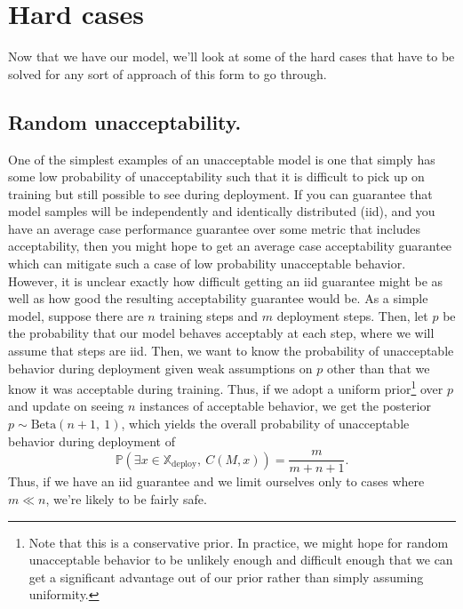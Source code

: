 \documentclass{amsart}
\begin{document}
\section{Hard cases}

Now that we have our model, we'll look at some of the hard cases that have to be solved for any sort of approach of this form to go through.

\subsection{Random unacceptability.} One of the simplest examples of an unacceptable model is one that simply has some low probability of unacceptability such that it is difficult to pick up on training but still possible to see during deployment. If you can guarantee that model samples will be independently and identically distributed (iid), and you have an average case performance guarantee over some metric that includes acceptability, then you might hope to get an average case acceptability guarantee which can mitigate such a case of low probability unacceptable behavior. However, it is unclear exactly how difficult getting an iid guarantee might be as well as how good the resulting acceptability guarantee would be. As a simple model, suppose there are $n$ training steps and $m$ deployment steps. Then, let $p$ be the probability that our model behaves acceptably at each step, where we will assume that steps are iid. Then, we want to know the probability of unacceptable behavior during deployment given weak assumptions on $p$ other than that we know it was acceptable during training. Thus, if we adopt a uniform prior\footnote{Note that this is a conservative prior. In practice, we might hope for random unacceptable behavior to be unlikely enough and difficult enough that we can get a significant advantage out of our prior rather than simply assuming uniformity.} over $p$ and update on seeing $n$ instances of acceptable behavior, we get the posterior $p \sim \text{Beta}(n+1,~ 1)$, which yields the overall probability of unacceptable behavior during deployment of
\[
    \mathbb P(\exists x \in \mathbb X_\text{deploy},~ C(M, x)) = \frac{m}{m + n + 1}.
\]
Thus, if we have an iid guarantee and we limit ourselves only to cases where $m \ll n$, we're likely to be fairly safe.
\end{document}
